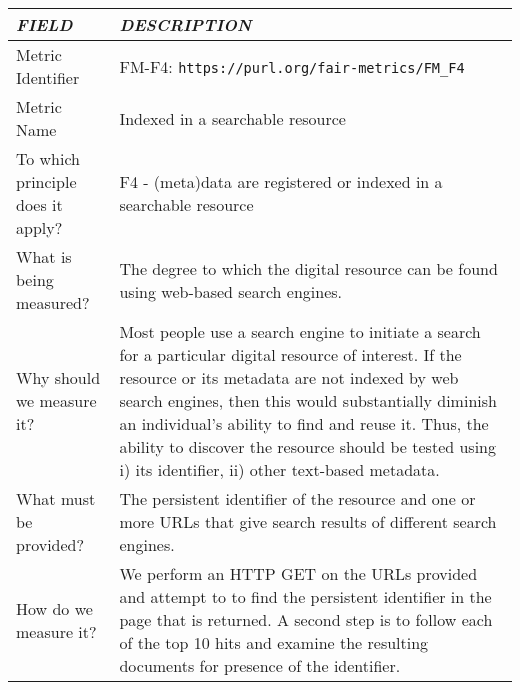 \documentclass[english]{article}
\begin{document}
\begin{longtable}{|p{5cm}|p{9cm}|}


\hline
\emph{FIELD} & \emph{DESCRIPTION} \\
\hline
Metric Identifier &   FM-F4: \verb"https://purl.org/fair-metrics/FM_F4"
 \\


\hline
Metric Name &   


Indexed in a searchable resource



 \\



\hline
To which principle does it apply? &   

F4 - (meta)data are registered or indexed in a searchable resource

\\



\hline
What is being measured? & 



The degree to which the digital resource can be found using  web-based search engines.


\\



\hline
Why should we measure it? & 




Most people use a search engine to initiate a search for a particular digital resource of interest. If the resource or its metadata are not indexed by web search engines, then this would substantially diminish an individual’s ability to find and reuse it. Thus, the ability to discover the resource should be tested using i) its identifier, ii) other text-based metadata. 


  
\\



\hline
What must be provided? &  


The persistent identifier of the resource and one or more URLs that give search results of different search engines.



\\



\hline
How do we measure it? &  


We perform an HTTP GET on the URLs provided and attempt to to find the persistent identifier in the page that is returned. A second step is to follow each of the top 10 hits and examine the resulting documents for presence of the identifier. 



\end{longtable}
\end{document}
